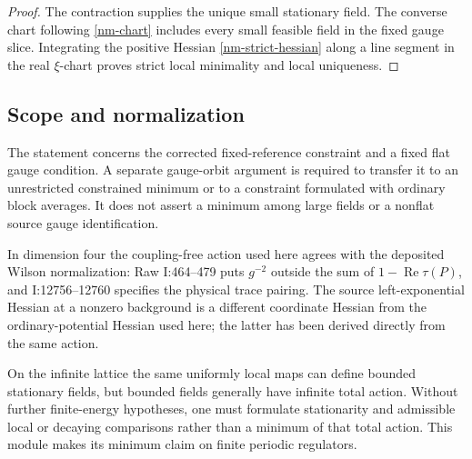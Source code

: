 \begin{proof}
The contraction supplies the unique small stationary field. The
converse chart following \eqref{nm-chart} includes every small
feasible field in the fixed gauge slice. Integrating the positive
Hessian \eqref{nm-strict-hessian} along a line segment in the real
$\xi$-chart proves strict local minimality and local uniqueness.
\end{proof}

\subsection{Scope and normalization}
\label{nm-scope}

The statement concerns the corrected fixed-reference constraint
and a fixed flat gauge condition. A separate gauge-orbit argument
is required to transfer it to an unrestricted constrained minimum
or to a constraint formulated with ordinary block averages. It
does not assert a minimum among large fields or a nonflat source
gauge identification.

In dimension four the coupling-free action used here agrees with
the deposited Wilson normalization: Raw I:464--479 puts $g^{-2}$
outside the sum of $1-\operatorname{Re}\tau(P)$, and
I:12756--12760 specifies the physical trace pairing. The source
left-exponential Hessian at a nonzero background is a different
coordinate Hessian from the ordinary-potential Hessian used here;
the latter has been derived directly from the same action.

On the infinite lattice the same uniformly local maps can define
bounded stationary fields, but bounded fields generally have
infinite total action. Without further finite-energy hypotheses,
one must formulate stationarity and admissible local or decaying
comparisons rather than a minimum of that total action. This
module makes its minimum claim on finite periodic regulators.
